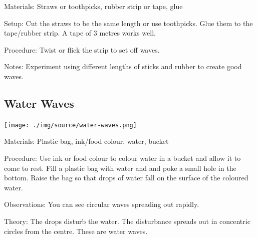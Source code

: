 \begin{multicols}{2}
\begin{description*}
\item[Materials:]{Straws or toothpicks, rubber strip or tape, glue}
\item[Setup:]{Cut the straws to be the same length or use toothpicks. Glue them to the tape/rubber strip. A tape of 3 metres works well.}
\item[Procedure:]{Twist or flick the strip to set off waves.}
\item[Notes:]{Experiment using different lengths of sticks and rubber to create good waves.}
\end{description*}

\subsection{Water Waves}

\begin{center}
\texttt{[image: ./img/source/water-waves.png]}
\end{center}

\begin{description*}
\item[Materials:]{Plastic bag, ink/food colour, water, bucket}
\item[Procedure:]{Use ink or food colour to colour water in a bucket and allow it to come to rest. Fill a plastic bag with water and and poke a small hole in the bottom. Raise the bag so that drops of water fall on the surface of the coloured water.}
\item[Observations:]{You can see circular waves spreading out rapidly.}
\item[Theory:]{The drops disturb the water. The disturbance spreads out in concentric circles from the centre. These are water waves.}
\end{description*}


\end{multicols}
